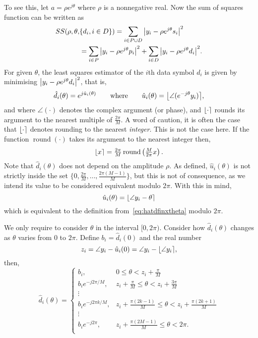 \documentclass[journal]{IEEEtran}
\begin{document}
To see this, let $a = \rho e^{j\theta}$ where $\rho$ is a nonnegative real.  Now the sum of squares function can be written as
\begin{align}
SS(\rho, \theta, &\{d_i, i \in D\}) = \sum_{i \in P \cup D} {\left|  y_i - \rho e^{j\theta} s_i  \right|}^2  \nonumber \\
&= \sum_{i \in P} {\left|  y_i - \rho e^{j\theta} p_i  \right|}^2 + \sum_{i \in D} {\left|  y_i - \rho e^{j\theta} d_i  \right|}^2. \label{eq:SSallparams}
\end{align}
For given $\theta$, the least squares estimator of the $i$th data symbol $d_i$ is given by minimising ${\left|  y_i - \rho e^{j\theta} d_i  \right|}^2$, that is,
\begin{equation}\label{eq:hatdfinxtheta}
\hat{d}_i(\theta) = e^{j\hat{u}_i(\theta)} \qquad \text{where} \qquad \hat{u}_i(\theta) = {\left\lfloor \angle( e^{-j\theta}y_i) \right\rceil},
\end{equation}
and where $\angle(\cdot)$ denotes the complex argument (or phase), and ${\left\lfloor \cdot \right\rceil}$ rounds its argument to the nearest multiple of $\frac{2\pi}{M}$.  A word of caution, it is often the case that ${\left\lfloor \cdot \right\rceil}$ denotes rounding to the nearest \emph{integer}.  This is not the case here.  If the function $\operatorname{round}(\cdot)$ takes its argument to the nearest integer then,
\[
{\left\lfloor x \right\rceil} = \tfrac{2\pi}{M}\operatorname{round}\left(\tfrac{M}{2\pi}x\right).
\] 
Note that $\hat{d}_i(\theta)$ does not depend on the amplitude $\rho$.  As defined, $\hat{u}_i(\theta)$ is not strictly inside the set $\{0, \tfrac{2\pi}{M}, \dots, \tfrac{2\pi(M-1)}{M}\}$, but this is not of consequence, as we intend its value to be considered equivalent modulo $2\pi$.  With this in mind,
\[
\hat{u}_i(\theta) = {\left\lfloor \angle{y_i} - \theta  \right\rceil}
\]
which is equivalent to the definition from~\eqref{eq:hatdfinxtheta} modulo $2\pi$.

We only require to consider $\theta$ in the interval $[0, 2\pi)$.  Consider how $\hat{d}_i(\theta)$ changes as $\theta$ varies from $0$ to $2\pi$.  Define $b_i = \hat{d}_i(0)$ and the real number 
\[
z_i = \angle{y_i} - \hat{u}_i(0) = \angle{y_i} - {\left\lfloor \angle{y_i} \right\rceil},
\]
then,
\begin{equation}\label{eq:uicombos}
\hat{d}_i(\theta) = 
\begin{cases}
b_i, &  0 \leq \theta < z_i + \frac{\pi}{M} \\
b_i e^{-j2\pi/M}, & z_i + \frac{\pi}{M} \leq \theta < z_i + \frac{3\pi}{M} \\ 
\vdots & \\
b_i e^{-j2\pi k /M}, & z_i + \frac{\pi(2k - 1)}{M} \leq \theta < z_i + \frac{\pi(2k + 1)}{M}  \\ 
\vdots & \\
b_i e^{-j2\pi}, &  z_i + \frac{\pi(2M - 1)}{M} \leq \theta < 2\pi. \\
\end{cases}
\end{equation}
\end{document}
